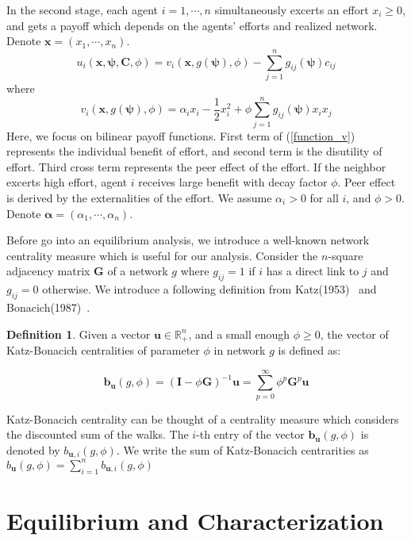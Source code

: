 \documentclass[12pt]{article}
\theoremstyle{definition}
\newtheorem{definition}{Definition}
\begin{document}
In the second stage, each agent $i = 1, \cdots, n$ simultaneously excerts an effort $x_i \ge 0$, and gets a payoff which depends on the agents' efforts and realized network.
Denote $\bm{x} = (x_1, \cdots, x_n)$.
\[ u_i(\bm{x}, \bm{\psi}, \bm{C}, \phi) = v_i(\bm{x}, g(\bm{\psi}), \phi) - \sum_{j=1}^n g_{ij}(\bm{\psi}) c_{ij} \]
where
\begin{equation}
\label{function_v}
	v_i(\bm{x}, g(\bm{\psi}), \phi) = \alpha_i x_i - \frac{1}{2} x_i^2 + \phi \sum_{j=1}^n g_{ij}(\bm{\psi}) x_i x_j
\end{equation}
Here, we focus on bilinear payoff functions.
First term of (\ref{function_v}) represents the individual benefit of effort, and second term is the disutility of effort.
Third cross term represents the peer effect of the effort.
If the neighbor excerts high effort, agent $i$ receives large benefit with decay factor $\phi$.
Peer effect is derived by the externalities of the effort.
We assume $\alpha_i > 0$ for all $i$, and $\phi > 0$.
Denote $\bm{\alpha} = (\alpha_1, \cdots, \alpha_n)$.

Before go into an equilibrium analysis, we introduce a well-known network centrality measure which is useful for our analysis.
Consider the $n$-square adjacency matrix $\bm{G}$ of a network $g$ where $g_{ij} = 1$ if $i$ has a direct link to $j$ and $g_{ij} = 0$ otherwise.
We introduce a following definition from Katz(1953)~\cite{katz} and Bonacich(1987)~\cite{bonacich}.

\begin{definition}
Given a vector $\bm{u} \in \mathbb{R}_+^n$, and a small enough $\phi \ge 0$, the vector of Katz-Bonacich centralities of parameter $\phi$ in network $g$ is defined as:

\[ \bm{b}_{\bm{u}}(g, \phi) = {(\bm{I} - \phi \bm{G})}^{-1} \bm{u} = \sum_{p=0}^{\infty} \phi^p \bm{G}^p \bm{u} \]

\end{definition}

Katz-Bonacich centrality can be thought of a centrality measure which considers the discounted sum of the walks.
The $i$-th entry of the vector $\bm{b}_{\bm{u}}(g, \phi)$ is denoted by $b_{\bm{u}, i}(g, \phi)$.
We write the sum of Katz-Bonacich centrarities as $b_{\bm{u}}(g, \phi) = \sum_{i=1}^n b_{\bm{u}, i}(g, \phi)$


\section{Equilibrium and Characterization}
\end{document}
